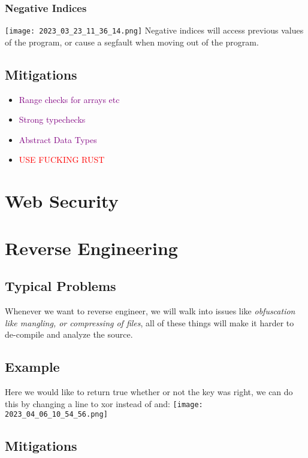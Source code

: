 \documentclass[main.tex,fontsize=8pt,paper=a4,paper=portrait,DIV=calc,]{scrartcl}
\begin{document}
\subsubsection{Negative Indices}
\texttt{[image: 2023\_03\_23\_11\_36\_14.png]}\newline
Negative indices will access previous values of the program, or cause a segfault when moving out of the program.

\subsection{Mitigations}
\begin{itemize}
\item \textcolor{purple}{Range checks for arrays etc}
\item \textcolor{purple}{Strong typechecks}
\item \textcolor{purple}{Abstract Data Types}
\item \textcolor{red}{USE FUCKING RUST}
\end{itemize} 

\section{Web Security}

\section{Reverse Engineering}

\subsection{Typical Problems}
Whenever we want to reverse engineer, we will walk into issues like \emph{obfuscation like mangling, or compressing of files}, all of these things will make it harder to de-compile and analyze the source.

\subsection{Example}
Here we would like to return true whether or not the key was right, we can do this by changing a line to xor instead of and:\newline
\texttt{[image: 2023\_04\_06\_10\_54\_56.png]}

\subsection{Mitigations}
\end{document}

